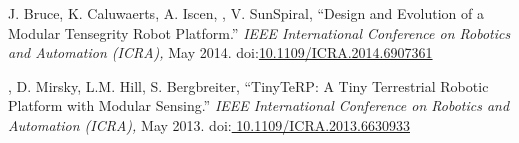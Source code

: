 \documentclass[letterpaper]{deedy-resume} %
\newcommand\doilink[1]{\href{http://dx.doi.org/#1}{#1}}
\newcommand\doi[1]{doi:\doilink{#1}}
\begin{document}
{\begin{etaremune}[itemsep=0.1cm]
\item J. Bruce, K. Caluwaerts, A. Iscen, \underline{{}}, V. SunSpiral, ``Design and Evolution of a Modular Tensegrity Robot Platform.'' {\it IEEE International Conference on Robotics and Automation (ICRA),} May 2014. \doi{10.1109/ICRA.2014.6907361}

\item \underline{{}}, D. Mirsky, L.M. Hill, S. Bergbreiter, ``TinyTeRP: A Tiny Terrestrial Robotic Platform with Modular Sensing.'' {\it IEEE International Conference on Robotics and Automation (ICRA),} May 2013. \doi{ 10.1109/ICRA.2013.6630933}

\end{etaremune}








  
}
\end{document}
